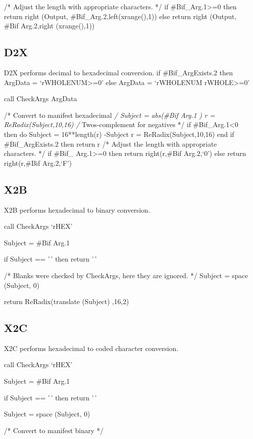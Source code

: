 /* Adjust the length with appropriate characters. */ if
\#Bif\_Arg.1\textgreater=0 then return right (Output,
\#Bif\_Arg.2,left(xrange(),1)) else return right (Output, \#Bif
Arg.2,right (xrange(),1))

\hypertarget{d2x}{%
\subsection{D2X}\label{d2x}}

D2X performs decimal to hexadecimal conversion. if \#Bif\_ArgExists.2
then ArgData = `rWHOLENUM\textgreater=0' else ArgData = `rWHOLENUM
rWHOLE\textgreater=0'

call CheckArgs ArgData

/* Convert to manifest hexadecimal \emph{/ Subject = abs(\#Bif Arg.1 ) r
= ReRadix(Subject,10,16) /} Twos-complement for negatives */ if
\#Bif\_Arg.1\textless0 then do Subject = 16**length(r) -Subject r =
ReRadix(Subject,10,16) end if \#Bif\_ArgExists.2 then return r /* Adjust
the length with appropriate characters. */ if \#Bif\_
Arg.1\textgreater=0 then return right(r,\#Bif Arg.2,`0') else return
right(r,\#Bif Arg.2,`F')

\hypertarget{x2b}{%
\subsection{X2B}\label{x2b}}

X2B performs hexadecimal to binary conversion.

call CheckArgs `rHEX'

Subject = \#Bif Arg.1

if Subject == '\,' then return '\,'

/* Blanks were checked by CheckArgs, here they are ignored. */ Subject =
space (Subject, 0)

return ReRadix(translate (Subject) ,16,2)

\hypertarget{x2c}{%
\subsection{X2C}\label{x2c}}

X2C performs hexadecimal to coded character conversion.

call CheckArgs `rHEX'

Subject = \#Bif Arg.1

if Subject == '\,' then return '\,'

Subject = space (Subject, 0)

/* Convert to manifest binary */

